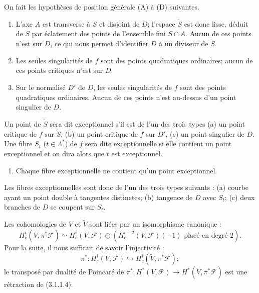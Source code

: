 \documentclass[12pt,a4paper]{article}
\theoremstyle{plain}
\theoremstyle{definition}
\theoremstyle{remark}
\begin{document}
On fait les hypoth\`eses de position g\'en\'erale (A) \`a (D) suivantes.
\begin{enumerate}[label=(\Alph*)]
\item L'axe $A$ est transverse \`a $S$ et disjoint de $D$; l'espace $\widetilde{S}$ est donc lisse, d\'eduit de $S$ par \'eclatement des points de l'ensemble fini $S \cap A$. Aucun de ces points n'est sur $D$, ce qui nous permet d'identifier $D$ \`a un diviseur de $\widetilde{S}$.
\item Les seules singularit\'es de $f$ sont des points quadratiques ordinaires; aucun de ces points critiques n'est sur $D$.
\item Sur le normalis\'e $D'$ de $D$, les seules singularit\'es de $f$ sont des points quadratiques ordinaires. Aucun de ces points n'est au-dessus d'un point singulier de $D$.
\end{enumerate}

Un point de $\widetilde{S}$ sera dit exceptionnel s'il est de l'un des trois types (a) un point critique de $f$ sur $\widetilde{S}$, (b) un point critique de $f$ sur $D'$, (c) un point singulier de $D$. Une fibre $S_t$ ($t \in \Lambda^*$) de $f$ sera dite exceptionnelle si elle contient un point exceptionnel et on dira alors que $t$ est exceptionnel.
\begin{enumerate}[label=(D)]
\item Chaque fibre exceptionnelle ne contient qu'un point exceptionnel.
\end{enumerate}


Les fibres exceptionnelles sont donc de l'un des trois types suivants : (a) courbe ayant un point double \`a tangentes distinctes; (b) tangence de $D$ avec $S_t$; (c) deux branches de $D$ se coupent sur $S_t$.

Les cohomologies de $V$ et $\widetilde{V}$ sont li\'ees par un isomorphisme canonique :
\begin{equation}\label{eq:3.1.1.3}
H_c^i(\widetilde{V}, \pi^*\mathscr{F}) \simeq H_c^i(V, \mathscr{F}) \oplus (H_c^{i-2}(V, \mathscr{F})(-1) \text{ plac\'e en degr\'e } 2).
\end{equation}
Pour la suite, il nous suffirait de savoir l'injectivit\'e :
\begin{equation}\label{eq:3.1.1.4}
\pi^* : H_c^i(V, \mathscr{F}) \hookrightarrow H_c^i(\widetilde{V}, \pi^*\mathscr{F});
\end{equation}
le transpos\'e par dualit\'e de Poincar\'e de $\pi^* : H^*(V, \mathscr{F}) \to H^*(\widetilde{V}, \pi^*\mathscr{F})$ est une r\'etraction de (3.1.1.4).
\end{document}
